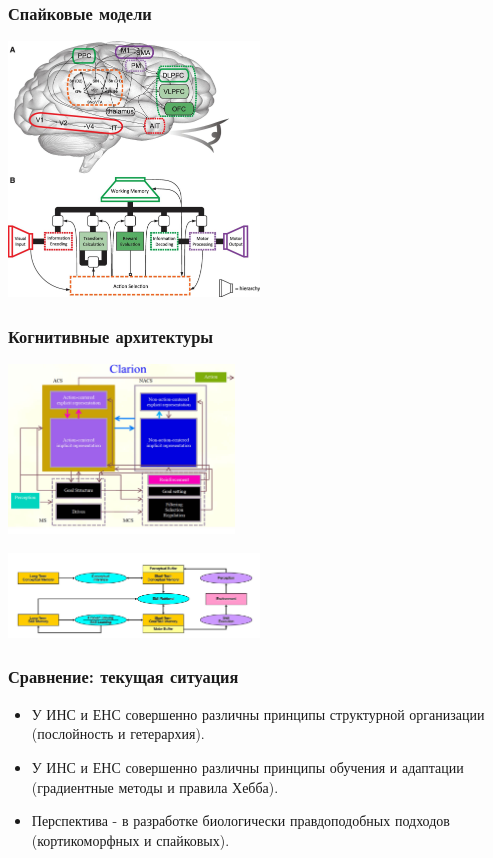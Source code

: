 \documentclass[default]{beamer}
\begin{document}
	\begin{frame}
		\frametitle{Спайковые модели}
		
		\begin{center}
			\includegraphics[width=0.5\textwidth]{spaun.jpeg}
		\end{center}
				
		\nocite{*}
		\printbibliography[keyword={spawn}, resetnumbers=true]
	\end{frame}

	\begin{frame}
		\frametitle{Когнитивные архитектуры}
		
		\begin{center}
			\includegraphics[width=0.45\textwidth]{clarion.jpg}
			
			\includegraphics[width=0.5\textwidth]{icarus.png}
		\end{center}
		
		\vspace{-5pt}
		\nocite{*}
		\printbibliography[keyword={symbgrnd}, resetnumbers=true]
	\end{frame}

	\begin{frame}
		\frametitle{Сравнение: текущая ситуация}
		
		\begin{itemize}
			\item У ИНС и ЕНС совершенно различны принципы структурной организации (послойность и гетерархия).
			\item У ИНС и ЕНС совершенно различны принципы обучения и адаптации (градиентные методы и правила Хебба).
			\item Перспектива - в разработке биологически правдоподобных подходов (кортикоморфных и спайковых).
		\end{itemize}
	\end{frame}
	
\end{document}
